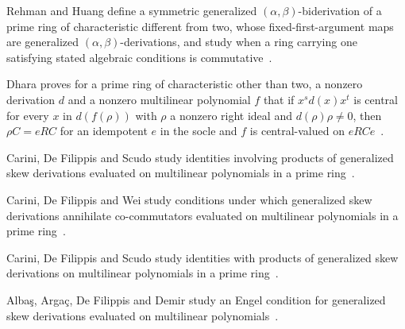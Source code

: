 Rehman and Huang define a symmetric generalized $(\alpha,\beta)$-biderivation of a prime ring of characteristic different from two, whose fixed-first-argument maps are generalized $(\alpha,\beta)$-derivations, and study when a ring carrying one satisfying stated algebraic conditions is commutative~\cite{WlOnLieIdealsAndSymmetricGeneral2019}.

Dhara proves for a prime ring of characteristic other than two, a nonzero derivation $d$ and a nonzero multilinear polynomial $f$ that if $x^sd(x)x^t$ is central for every $x$ in $d(f(\rho))$ with $\rho$ a nonzero right ideal and $d(\rho)\rho\neq 0$, then $\rho C=eRC$ for an idempotent $e$ in the socle and $f$ is central-valued on $eRCe$~\cite{WlDerivationsWithPowerCentralVal2008}.

Carini, De Filippis and Scudo study identities involving products of generalized skew derivations evaluated on multilinear polynomials in a prime ring~\cite{WlIdentitiesWithProductOfGeneral2016}.

Carini, De Filippis and Wei study conditions under which generalized skew derivations annihilate co-commutators evaluated on multilinear polynomials in a prime ring~\cite{WlAnnihilatingCoCommutatorsWithG2017}.

Carini, De Filippis and Scudo study identities with products of generalized skew derivations on multilinear polynomials in a prime ring~\cite{WlIdentitiesWithProductOfGeneral2020}.

Alba\c{s}, Arga\c{c}, De Filippis and Demir study an Engel condition for generalized skew derivations evaluated on multilinear polynomials~\cite{WlAnEngelConditionWithGeneralize2020}.
